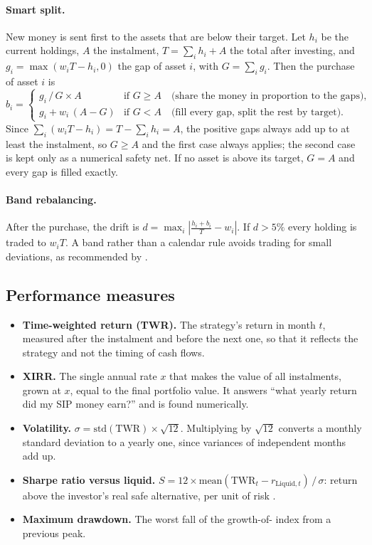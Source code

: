 \paragraph{Smart split.} New money is sent first to the assets that are below their target. Let
$h_i$ be the current holdings, $A$ the instalment, $T = \sum_i h_i + A$ the total after investing,
and $g_i = \max(w_i T - h_i, 0)$ the gap of asset $i$, with $G = \sum_i g_i$. Then the purchase of
asset $i$ is
\begin{equation}
  b_i =
  \begin{cases}
    g_i \,/\, G \times A & \text{if } G \ge A \quad\text{(share the money in proportion to the gaps)},\\[2pt]
    g_i + w_i\,(A - G) & \text{if } G < A \quad\text{(fill every gap, split the rest by target)}.
  \end{cases}
  \label{eq:smart}
\end{equation}
Since $\sum_i (w_i T - h_i) = T - \sum_i h_i = A$, the positive gaps always add up to at least the
instalment, so $G \ge A$ and the first case always applies; the second case is kept only as a
numerical safety net. If no asset is above its target, $G = A$ and every gap is filled exactly.

\paragraph{Band rebalancing.} After the purchase, the drift is
$d = \max_i \left| \frac{h_i + b_i}{T} - w_i \right|$. If $d > 5\%$ every holding is traded to
$w_i T$. A band rather than a calendar rule avoids trading for small deviations, as recommended by
\citet{jaconetti2010}.

\subsection{Performance measures}
\label{sec:metrics}

\begin{itemize}
  \item \textbf{Time-weighted return (TWR).} The strategy's return in month $t$, measured after the
        instalment and before the next one, so that it reflects the strategy and not the timing of
        cash flows.
  \item \textbf{XIRR.} The single annual rate $x$ that makes the value of all instalments, grown at
        $x$, equal to the final portfolio value. It answers ``what yearly return did my SIP money
        earn?'' and is found numerically.
  \item \textbf{Volatility.} $\sigma = \text{std}(\text{TWR}) \times \sqrt{12}$. Multiplying by
        $\sqrt{12}$ converts a monthly standard deviation to a yearly one, since variances of
        independent months add up.
  \item \textbf{Sharpe ratio versus liquid.}
        $S = 12 \times \text{mean}(\text{TWR}_t - r_{\text{Liquid},t}) \,/\, \sigma$: return above
        the investor's real safe alternative, per unit of risk \citep{sharpe1994}.
  \item \textbf{Maximum drawdown.} The worst fall of the growth-of- index from a previous peak.
\end{itemize}

